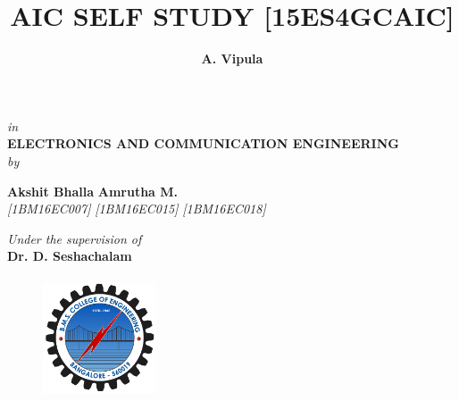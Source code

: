 \title{\fontsize{14pt}{16.8pt}\selectfont\bf{AIC SELF STUDY [15ES4GCAIC]}}
\date{}

\maketitle
\thispagestyle{empty}

\begin{center}
\vspace*{-16mm}

{\fontsize{14pt}{16.8pt}\selectfont\textit{in}} \\
\vspace*{3mm}
%
{\fontsize{14pt}{16.8pt}\selectfont\textbf{ELECTRONICS AND COMMUNICATION ENGINEERING}} \\

\vspace*{5mm}
{\fontsize{14pt}{16.8pt}\selectfont\textit{by}} \\
\vspace*{5mm}

\author{\fontsize{14pt}{16.8pt}\selectfont\textbf{A. Vipula}}  \hspace*{12mm} {\fontsize{14pt}{16.8pt}\selectfont\textbf{Akshit Bhalla}} \hspace*{12mm} {\fontsize{14pt}{16.8pt}\selectfont\textbf{Amrutha M.}}\\
\vspace*{2mm}
{\fontsize{12pt}{14.4pt}\selectfont\textit{[1BM16EC007]} \hspace*{12mm} \selectfont\textit{[1BM16EC015]} \hspace*{12mm} \selectfont\textit{[1BM16EC018]} } \\



\vspace*{3mm}

\vspace*{4mm}\fontsize{14pt}{16.8pt}\selectfont\textit{Under the supervision of} \\
\vspace*{2mm}\fontsize{14pt}{16.8pt}\selectfont\textbf{Dr. D. Seshachalam} \\
\vspace*{8mm}

\begin{figure}[!ht]
\centering
\includegraphics[height=36.068mm,width=33.274mm]{assets/BMSCE_Logo.png}
\end{figure}


\end{center}
